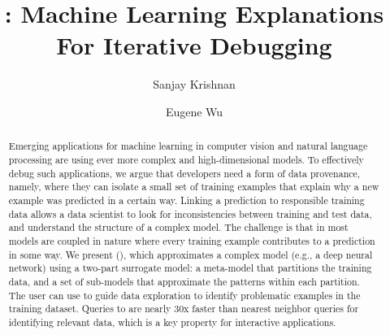 \documentclass[sigconf]{acmart}
\begin{document}
\def\ojoin{\setbox0=\hbox{$\bowtie$}%
  \rule[-.02ex]{.25em}{.4pt}\llap{\rule[\ht0]{.25em}{.4pt}}}
\def\leftouterjoin{\mathbin{\ojoin\mkern-5.8mu\bowtie}}
\def\rightouterjoin{\mathbin{\bowtie\mkern-5.8mu\ojoin}}
\def\fullouterjoin{\mathbin{\ojoin\mkern-5.8mu\bowtie\mkern-5.8mu\ojoin}}


\newcommand{\stitle}[1]{\vspace{0.5em}\noindent\textbf{#1}}




%

\title{\sys: Machine Learning Explanations For Iterative Debugging}



\author{Sanjay Krishnan}

\author{Eugene Wu}






\begin{abstract}
Emerging applications for machine learning in computer vision and natural language processing are using ever more complex and high-dimensional models.
To effectively debug such applications,  we argue that developers need a form of data provenance, namely, where they can isolate a small set of training examples that explain why a new example was predicted in a certain way.
Linking a prediction to responsible training data allows a data scientist to look for inconsistencies between training and test data, and understand the structure of a complex model.
The challenge is that in most models are coupled in nature where every training example contributes to a prediction in some way.
We present \sysfull (\sys), which approximates a complex model (e.g., a deep neural network) using a two-part surrogate model: a meta-model that partitions the training data, and a set of sub-models that approximate the patterns within each partition.
The user can use \sys to guide data exploration to identify problematic examples in the training dataset.
Queries to \sys are nearly 30x faster than nearest neighbor queries for identifying relevant data, which is a key property for interactive applications.
\end{abstract}
\end{document}
